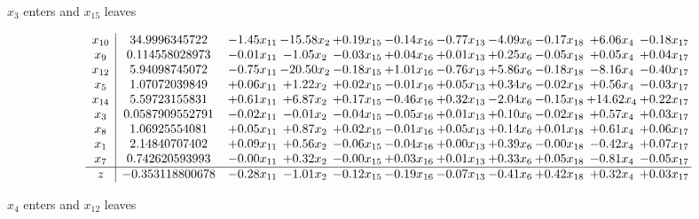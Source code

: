 \documentclass[9pt]{article}
\begin{document}
 $ x_{3} $ enters and $ x_{15} $ leaves 

 \[\begin{array}{c| c c@{\hskip 2pt} c@{\hskip 2pt} c@{\hskip 2pt} c@{\hskip 2pt} c@{\hskip 2pt} c@{\hskip 2pt} c@{\hskip 2pt} c@{\hskip 2pt} c@{\hskip 2pt} }
 x_{10}   &  34.9996345722 & -1.45 x_{11} & -15.58 x_{2} & +  0.19 x_{15} & -0.14 x_{16} & -0.77 x_{13} & -4.09 x_{6} & -0.17 x_{18} & +  6.06 x_{4} & -0.18 x_{17}\\
 x_{9}   &  0.114558028973 & -0.01 x_{11} & -1.05 x_{2} & -0.03 x_{15} & +  0.04 x_{16} & +  0.01 x_{13} & +  0.25 x_{6} & -0.05 x_{18} & +  0.05 x_{4} & +  0.04 x_{17}\\
 x_{12}   &  5.94098745072 & -0.75 x_{11} & -20.50 x_{2} & -0.18 x_{15} & +  1.01 x_{16} & -0.76 x_{13} & +  5.86 x_{6} & -0.18 x_{18} & -8.16 x_{4} & -0.40 x_{17}\\
 x_{5}   &  1.07072039849 & +  0.06 x_{11} & +  1.22 x_{2} & +  0.02 x_{15} & -0.01 x_{16} & +  0.05 x_{13} & +  0.34 x_{6} & -0.02 x_{18} & +  0.56 x_{4} & -0.03 x_{17}\\
 x_{14}   &  5.59723155831 & +  0.61 x_{11} & +  6.87 x_{2} & +  0.17 x_{15} & -0.46 x_{16} & +  0.32 x_{13} & -2.04 x_{6} & -0.15 x_{18} & + 14.62 x_{4} & +  0.22 x_{17}\\
 x_{3}   &  0.0587909552791 & -0.02 x_{11} & -0.01 x_{2} & -0.04 x_{15} & -0.05 x_{16} & +  0.01 x_{13} & +  0.10 x_{6} & -0.02 x_{18} & +  0.57 x_{4} & +  0.03 x_{17}\\
 x_{8}   &  1.06925554081 & +  0.05 x_{11} & +  0.87 x_{2} & +  0.02 x_{15} & -0.01 x_{16} & +  0.05 x_{13} & +  0.14 x_{6} & +  0.01 x_{18} & +  0.61 x_{4} & +  0.06 x_{17}\\
 x_{1}   &  2.14840707402 & +  0.09 x_{11} & +  0.56 x_{2} & -0.06 x_{15} & -0.04 x_{16} & +  0.00 x_{13} & +  0.39 x_{6} & -0.00 x_{18} & -0.42 x_{4} & +  0.07 x_{17}\\
 x_{7}   &  0.742620593993 & -0.00 x_{11} & +  0.32 x_{2} & -0.00 x_{15} & +  0.03 x_{16} & +  0.01 x_{13} & +  0.33 x_{6} & +  0.05 x_{18} & -0.81 x_{4} & -0.05 x_{17}\\
\hline
z    &  -0.353118800678 & -0.28 x_{11} & -1.01 x_{2} & -0.12 x_{15} & -0.19 x_{16} & -0.07 x_{13} & -0.41 x_{6} & +  0.42 x_{18} & +  0.32 x_{4} & +  0.03 x_{17}\\
\end{array}\]


 $ x_{4} $ enters and $ x_{12} $ leaves 
\end{document}
